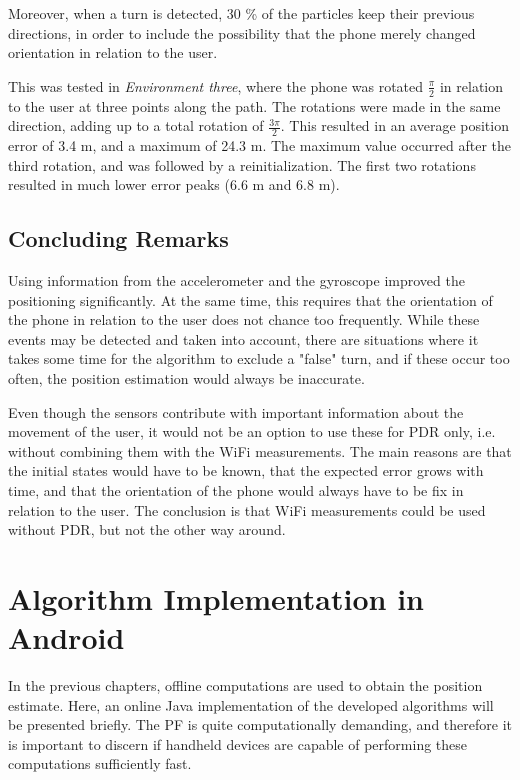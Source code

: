 \documentclass{LTHthesis}
\begin{document}
Moreover, when a turn is detected, 30 \% of the particles keep their previous directions, in order to include the possibility that the phone merely changed orientation in relation to the user.

This was tested in \emph{Environment three}, where the phone was rotated $\frac{\pi}{2}$ in relation to the user at three points along the path. The rotations were made in the same direction, adding up to a total rotation of $\frac{3\pi}{2}$. This resulted in an average position error of 3.4 m, and a maximum of 24.3 m. The maximum value occurred after the third rotation, and was followed by a reinitialization. The first two rotations resulted in much lower error peaks (6.6 m and 6.8 m).




\section{Concluding Remarks}
%
Using information from the accelerometer and the gyroscope improved the positioning significantly. At the same time, this requires that the orientation of the phone in relation to the user does not chance too frequently. While these events may be detected and taken into account, there are situations where it takes some time for the algorithm to exclude a "false" turn, and if these occur too often, the position estimation would always be inaccurate.

Even though the sensors contribute with important information about the movement of the user, it would not be an option to use these for PDR only, i.e. without combining them with the WiFi measurements. The main reasons are that the initial states would have to be known, that the expected error grows with time, and that the orientation of the phone would always have to be fix in relation to the user. The conclusion is that WiFi measurements could be used without PDR, but not the other way around.






\chapter{Algorithm Implementation in Android}
\label{chap:implement}
%
In the previous chapters, offline computations are used to obtain the position estimate. Here, an online Java implementation of the developed algorithms will be presented briefly. The PF is quite computationally demanding, and therefore it is important to discern if handheld devices are capable of performing these computations sufficiently fast. 
\end{document}
